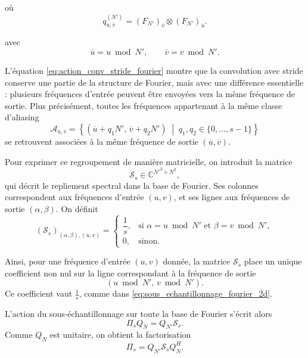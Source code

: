 où
\[
    q_{\overline{u},\overline{v}}^{(N')}
    =
    (F_{N'})_{\overline{v}} \otimes (F_{N'})_{\overline{u}}.
\]

avec
\[
    \overline{u}=u \bmod N',
    \qquad
    \overline{v}=v \bmod N'.
\]

L'équation \eqref{eq:action_conv_stride_fourier} montre que la convolution avec stride conserve une partie
de la structure de Fourier, mais avec une différence essentielle : plusieurs fréquences d'entrée peuvent être
envoyées vers la même fréquence de sortie. Plus précisément, toutes les fréquences appartenant à la même
classe d'aliasing
\[
    \mathcal{A}_{\overline{u},\overline{v}}
    =
    \left\{
        (\overline{u}+q_1N',\,\overline{v}+q_2N')
        \;\middle|\;
        q_1,q_2\in\{0,\dots,s-1\}
    \right\}
\]
se retrouvent associées à la même fréquence de sortie $(\overline{u},\overline{v})$.

Pour exprimer ce regroupement de manière matricielle, on introduit la matrice
\[
    \mathcal{S}_s \in \mathbb{C}^{N'^2 \times N^2},
\]
qui décrit le repliement spectral dans la base de Fourier. Ses colonnes correspondent aux fréquences
d'entrée $(u,v)$, et ses lignes aux fréquences de sortie $(\alpha,\beta)$. On définit
\begin{equation}
    (\mathcal{S}_s)_{(\alpha,\beta),(u,v)}
    =
    \begin{cases}
        \dfrac{1}{s},
        & \text{si } \alpha = u \bmod N'
        \text{ et } \beta = v \bmod N', \\[0.4em]
        0,
        & \text{sinon.}
    \end{cases}
    \label{eq:def_matrice_sampling_fourier}
\end{equation}

Ainsi, pour une fréquence d'entrée $(u,v)$ donnée, la matrice $\mathcal{S}_s$ place un unique coefficient
non nul sur la ligne correspondant à la fréquence de sortie
\[
    (u \bmod N',\, v \bmod N').
\]
Ce coefficient vaut $\frac{1}{s}$, comme dans \eqref{eq:sous_echantillonnage_fourier_2d}.

L'action du sous-échantillonnage sur toute la base de Fourier s'écrit alors
\begin{equation}
    \Pi_s Q_N
    =
    Q_{N'} \mathcal{S}_s.
    \label{eq:sampling_base_fourier}
\end{equation}
Comme $Q_N$ est unitaire, on obtient la factorisation
\begin{equation}
    \Pi_s
    =
    Q_{N'} \mathcal{S}_s Q_N^H.
    \label{eq:factorisation_sampling_fourier}
\end{equation}

